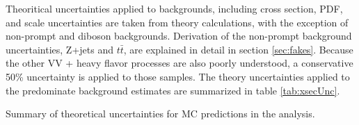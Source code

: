 Theoritical uncertainties applied to backgrounds, including cross section, PDF, and scale uncertainties are taken from theory calculations, with the exception of non-prompt and diboson backgrounds. Derivation of the non-prompt background uncertainties, Z+jets and $t\bar{t}$, are explained in detail in section \ref{sec:fakes}. Because the other VV + heavy flavor processes are also poorly understood, a conservative 50\% uncertainty is applied to those samples. The theory uncertainties applied to the predominate background estimates are summarized in table \ref{tab:xsecUnc}. 

\begin{table}[!htbp]
{\footnotesize
\centering

\caption{Summary of theoretical uncertainties for MC predictions in the analysis.}
\label{tab:xsecUnc}
}
\end{table}
